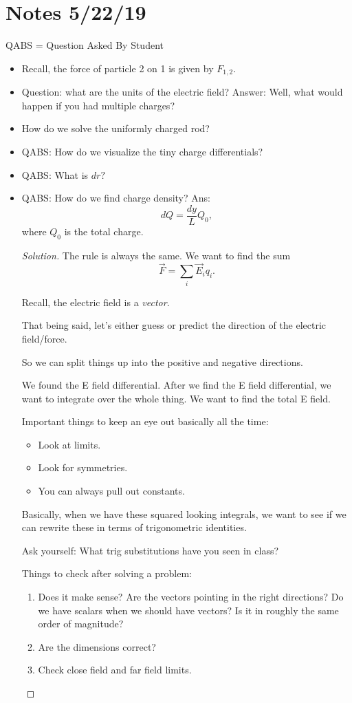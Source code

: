 \documentclass[12pt]{extreport}
\newenvironment{solution}
  {\renewcommand\qedsymbol{$\blacksquare$}\begin{proof}[Solution]}
  {\end{proof}}
\begin{document}
\section{Notes 5/22/19}
QABS = Question Asked By Student
\begin{itemize}
	\item Recall, the force of particle 2 on 1 is given by $F_{1,2}$.
	\item Question: what are the units of the electric field? Answer: Well, what would happen if you had multiple charges?
	\item How do we solve the uniformly charged rod?
	\item QABS: How do we visualize the tiny charge differentials?
	\item QABS: What is $dr?$
	\item QABS: How do we find charge density? Ans: $$dQ = \frac{dy}{L} Q_0,$$ where $Q_0$ is the total charge.

	\begin{solution}
		The rule is always the same. We want to find the sum $$\vec F = \sum_{i} \vec E_i q_i.$$

		Recall, the electric field is a \textit{vector}. 

		That being said, let's either guess or predict the direction of the electric field/force.

		So we can split things up into the positive and negative directions.

		We found the E field differential. After we find the E field differential, we want to integrate over the whole thing. We want to find the total E field. 

		Important things to keep an eye out basically all the time:
		\begin{itemize}
			\item Look at limits.
			\item Look for symmetries.
			\item You can always pull out constants.
		\end{itemize}

		Basically, when we have these squared looking integrals, we want to see if we can rewrite these in terms of trigonometric identities. 

		Ask yourself: What trig substitutions have you seen in class?

		Things to check after solving a problem:
		\begin{enumerate}
			\item Does it make sense? Are the vectors pointing in the right directions? Do we have scalars when we should have vectors? Is it in roughly the same order of magnitude?
			\item Are the dimensions correct?	
			\item Check close field and far field limits.
		\end{enumerate}			

	\end{solution}
\end{itemize}
\end{document}
